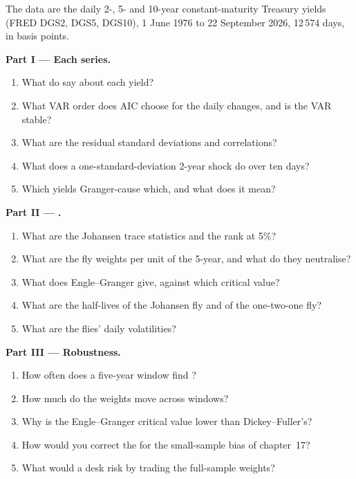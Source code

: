\begin{problem}\label{pb:qm:multivariate-series-and-cointegration:1}
The data are the daily 2-, 5- and 10-year constant-maturity Treasury yields (FRED DGS2, DGS5, DGS10), 1 June 1976 to 22 September 2026, 12\,574 days, in basis points.

\medskip\noindent\textbf{Part I --- Each series.}
\begin{enumerate}
\item What do  say about each yield?
\item What VAR order does AIC choose for the daily changes, and is the VAR stable?
\item What are the residual standard deviations and correlations?
\item What does a one-standard-deviation 2-year shock do over ten days?
\item Which yields Granger-cause which, and what does it mean?
\end{enumerate}

\medskip\noindent\textbf{Part II --- .}
\begin{enumerate}[resume]
\item What are the Johansen trace statistics and the rank at 5\%?
\item What are the fly weights per unit of the 5-year, and what do they neutralise?
\item What does Engle--Granger give, against which critical value?
\item What are the half-lives of the Johansen fly and of the one-two-one fly?
\item What are the flies' daily volatilities?
\end{enumerate}

\medskip\noindent\textbf{Part III --- Robustness.}
\begin{enumerate}[resume]
\item How often does a five-year window find ?
\item How much do the weights move across windows?
\item Why is the Engle--Granger critical value lower than Dickey--Fuller's?
\item How would you correct the  for the small-sample bias of chapter~17?
\item What would a desk risk by trading the full-sample weights?
\end{enumerate}


\end{problem}
